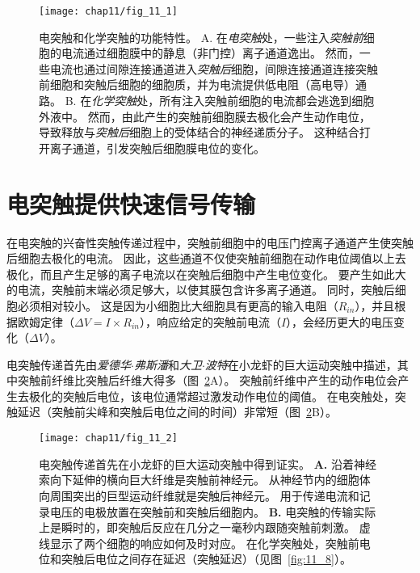 \begin{figure}[htbp]
	\centering
	\texttt{[image: chap11/fig\_11\_1]}
	\caption{电突触和化学突触的功能特性。
		A. 在\textit{电突触}处，一些注入\textit{突触前}细胞的电流通过细胞膜中的静息（非门控）离子通道逸出。
		然而，一些电流也通过间隙连接通道进入\textit{突触后}细胞，间隙连接通道连接突触前细胞和突触后细胞的细胞质，并为电流提供低电阻（高电导）通路。
		B. 在\textit{化学突触}处，所有注入突触前细胞的电流都会逃逸到细胞外液中。
		然而，由此产生的突触前细胞膜去极化会产生动作电位，导致释放与\textit{突触后}细胞上的受体结合的神经递质分子。
		这种结合打开离子通道，引发突触后细胞膜电位的变化。}
	\label{fig:11_1}
\end{figure}


\section{电突触提供快速信号传输}

在电突触的兴奋性突触传递过程中，突触前细胞中的电压门控离子通道产生使突触后细胞去极化的电流。
因此，这些通道不仅使突触前细胞在动作电位阈值以上去极化，而且产生足够的离子电流以在突触后细胞中产生电位变化。
要产生如此大的电流，突触前末端必须足够大，以使其膜包含许多离子通道。
同时，突触后细胞必须相对较小。
这是因为小细胞比大细胞具有更高的输入电阻（$R_{in}$），并且根据欧姆定律（$\Delta V = I \times R_{in}$），响应给定的突触前电流（$I$），会经历更大的电压变化（$\Delta V$）。


电突触传递首先由\textit{爱德华$\cdot$弗斯潘}和\textit{大卫$\cdot$波特}在小龙虾的巨大运动突触中描述，其中突触前纤维比突触后纤维大得多（图~\ref{fig:11_2}A）。
突触前纤维中产生的动作电位会产生去极化的突触后电位，该电位通常超过激发动作电位的阈值。
在电突触处，突触延迟（突触前尖峰和突触后电位之间的时间）非常短（图~\ref{fig:11_2}B）。


\begin{figure}[htbp]
	\centering
	\texttt{[image: chap11/fig\_11\_2]}
	\caption{电突触传递首先在小龙虾的巨大运动突触中得到证实\cite{furshpan1959transmission,furshpan1957mechanism}。 
		\textbf{A.} 沿着神经索向下延伸的横向巨大纤维是突触前神经元。
		从神经节内的细胞体向周围突出的巨型运动纤维就是突触后神经元。
		用于传递电流和记录电压的电极放置在突触前和突触后细胞内。
		\textbf{B.} 电突触的传输实际上是瞬时的，即突触后反应在几分之一毫秒内跟随突触前刺激。
		虚线显示了两个细胞的响应如何及时对应。
		在化学突触处，突触前电位和突触后电位之间存在延迟（突触延迟）（见图~\ref{fig:11_8}）。}
	\label{fig:11_2}
\end{figure}


